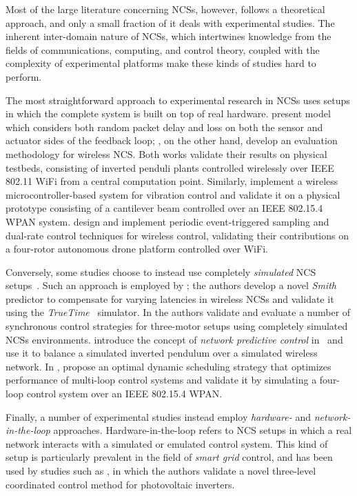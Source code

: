 Most of the large literature concerning \acp{NCS}, however, follows a theoretical approach, and only a small fraction of it deals with experimental studies.
The inherent inter-domain nature of \acp{NCS}, which intertwines knowledge from the fields of communications, computing, and control theory, coupled with the complexity of experimental platforms make these kinds of studies hard to perform.

The most straightforward approach to experimental research in \acp{NCS} uses setups in which the complete system is built on top of real hardware.
\textcite{Drew2005NCSWLAN} present  model which considers both random packet delay and loss on both the sensor and actuator sides of the feedback loop; \textcite{Baumann2018LowPower}, on the other hand, develop an evaluation methodology for wireless \ac{NCS}.
Both works validate their results on physical testbeds, consisting of inverted penduli plants controlled wirelessly over IEEE 802.11 WiFi from a central computation point.
Similarly, \textcite{Li2014Wireless} implement a wireless microcontroller-based system for vibration control and validate it on a physical prototype consisting of a cantilever beam controlled over an IEEE 802.15.4 \ac{WPAN} system.
\textcite{Cuenca2019UAV} design and implement periodic event-triggered sampling and dual-rate control techniques for wireless control, validating their contributions on a four-rotor autonomous drone platform controlled over WiFi.

Conversely, some studies choose to instead use completely \emph{simulated} \ac{NCS} setups~\cite{Andersson2005Simulation,Eyisi2012NCSWT}.
Such an approach is employed by \textcite{Du2009Smith}; the authors develop a novel \emph{Smith} predictor to compensate for varying latencies in wireless \acp{NCS} and validate it using the \emph{TrueTime}~\cite{Henriksson2002TrueTime} simulator.
In \textcite{Chen2015synccontrol} the authors validate and evaluate a number of synchronous control strategies for three-motor setups using completely simulated \acp{NCS} environments.
\citeauthor{Wu2012NPC} introduce the concept of \emph{network predictive control} in\ \cite{Wu2012NPC} and use it to balance a simulated inverted pendulum over a simulated wireless network.
In \cite{Ma2019DynamicSched}, \citeauthor{Ma2019DynamicSched} propose an optimal dynamic scheduling strategy that optimizes performance of multi-loop control systems and validate it by simulating a four-loop control system over an IEEE 802.15.4 \ac{WPAN}.


Finally, a number of experimental studies instead employ \emph{hardware-} and \emph{network-in-the-loop} approaches.
Hardware-in-the-loop refers to \ac{NCS} setups in which a real network interacts with a simulated or emulated control system.
This kind of setup is particularly prevalent in the field of \emph{smart grid} control, and has been used by studies such as \textcite{Wang2020VoltageControl}, in which the authors validate a novel three-level coordinated control method for photovoltaic inverters.

